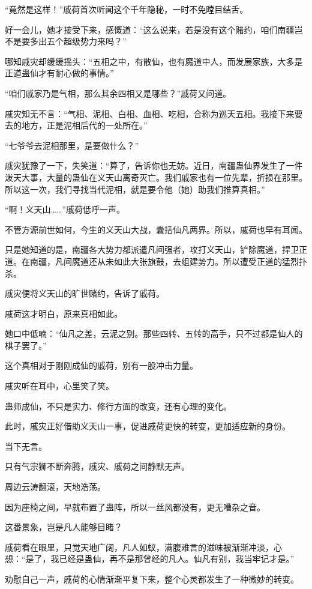 \begin{this_body}
“竟然是这样！”戚荷首次听闻这个千年隐秘，一时不免瞠目结舌。

好一会儿，她才接受下来，感慨道：“这么说来，若是没有这个赌约，咱们南疆岂不是要多出五个超级势力来吗？”

哪知戚灾却缓缓摇头：“五相之中，有散仙，也有魔道中人，而发展家族，大多是正道蛊仙才有耐心做的事情。”

“咱们戚家乃是气相，那么其余四相又是哪些？”戚荷又问道。

戚灾知无不言：“气相、泥相、白相、血相、吃相，合称为巡天五相。我接下来要去的地方，正是泥相后代的一处所在。”

“七爷爷去泥相那里，是要做什么？”

戚灾犹豫了一下，失笑道：“算了，告诉你也无妨。近日，南疆蛊仙界发生了一件泼天大事，大量的蛊仙在义天山离奇灭亡。我们戚家也有一位先辈，折损在那里。所以这一次，我们寻找当代泥相，就是要令他（她）助我们推算真相。”

“啊！义天山……”戚荷低呼一声。

不管方源前世如何，今生的义天山大战，囊括仙凡两界。所以，戚荷也早有耳闻。

只是她知道的是，南疆各大势力都派遣凡间强者，攻打义天山，铲除魔道，捍卫正道。在南疆，凡间魔道还从未如此大张旗鼓，去组建势力。所以遭受正道的猛烈扑杀。

戚灾便将义天山的旷世赌约，告诉了戚荷。

戚荷这才明白，原来真相如此。

她口中低喃：“仙凡之差，云泥之别。那些四转、五转的高手，只不过都是仙人的棋子罢了。”

这个真相对于刚刚成仙的戚荷，别有一股冲击力量。

戚灾听在耳中，心里笑了笑。

蛊师成仙，不只是实力、修行方面的改变，还有心理的变化。

此时，戚灾正好借助义天山一事，促进戚荷更快的转变，更加适应新的身份。

当下无言。

只有气宗狮不断奔腾，戚灾、戚荷之间静默无声。

周边云涛翻滚，天地浩荡。

因为座椅之间，早就布置了蛊阵，所以一丝风都没有，更无嘈杂之音。

这番景象，岂是凡人能够目睹？

戚荷看在眼里，只觉天地广阔，凡人如蚁，满腹难言的滋味被渐渐冲淡，心想：“是了，我已经是蛊仙，再不是那曾经的凡人。仙凡有别，我当牢记才是。”

劝慰自己一声，戚荷的心情渐渐平复下来，整个心灵都发生了一种微妙的转变。


\end{this_body}
